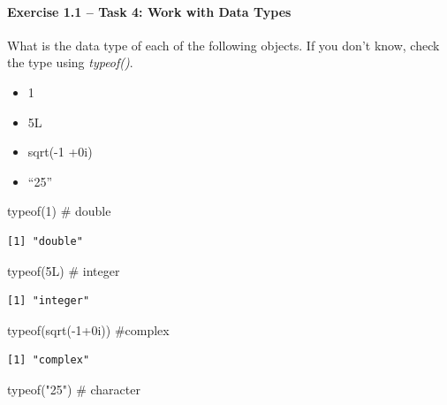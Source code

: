 \documentclass[
  letterpaper,
  DIV=11,
  numbers=noendperiod]{scrartcl}
\let\oldparagraph\paragraph
\renewcommand{\paragraph}[1]{\oldparagraph{#1}\mbox{}}
\newenvironment{Shaded}{\begin{snugshade}}{\end{snugshade}}
\newcommand{\CommentTok}[1]{\textcolor[rgb]{0.37,0.37,0.37}{#1}}
\newcommand{\DecValTok}[1]{\textcolor[rgb]{0.68,0.00,0.00}{#1}}
\newcommand{\FunctionTok}[1]{\textcolor[rgb]{0.28,0.35,0.67}{#1}}
\newcommand{\NormalTok}[1]{\textcolor[rgb]{0.00,0.23,0.31}{#1}}
\newcommand{\SpecialCharTok}[1]{\textcolor[rgb]{0.37,0.37,0.37}{#1}}
\newcommand{\StringTok}[1]{\textcolor[rgb]{0.13,0.47,0.30}{#1}}
\begin{document}
\hypertarget{exercise-1.1-task-4-work-with-data-types}{%
\paragraph{Exercise 1.1 -- Task 4: Work with Data
Types}\label{exercise-1.1-task-4-work-with-data-types}}

What is the data type of each of the following objects. If you don't
know, check the type using \emph{typeof()}.

\begin{itemize}
\item
  1
\item
  5L
\item
  sqrt(-1 +0i)
\item
  ``25''
\end{itemize}

\begin{Shaded}
\begin{Highlighting}[]
\FunctionTok{typeof}\NormalTok{(}\DecValTok{1}\NormalTok{)  }\CommentTok{\# double}
\end{Highlighting}
\end{Shaded}

\begin{verbatim}
[1] "double"
\end{verbatim}

\begin{Shaded}
\begin{Highlighting}[]
\FunctionTok{typeof}\NormalTok{(5L) }\CommentTok{\# integer}
\end{Highlighting}
\end{Shaded}

\begin{verbatim}
[1] "integer"
\end{verbatim}

\begin{Shaded}
\begin{Highlighting}[]
\FunctionTok{typeof}\NormalTok{(}\FunctionTok{sqrt}\NormalTok{(}\SpecialCharTok{{-}}\DecValTok{1}\SpecialCharTok{+}\NormalTok{0i)) }\CommentTok{\#complex}
\end{Highlighting}
\end{Shaded}

\begin{verbatim}
[1] "complex"
\end{verbatim}

\begin{Shaded}
\begin{Highlighting}[]
\FunctionTok{typeof}\NormalTok{(}\StringTok{"25"}\NormalTok{) }\CommentTok{\# character}
\end{Highlighting}
\end{Shaded}
\end{document}

